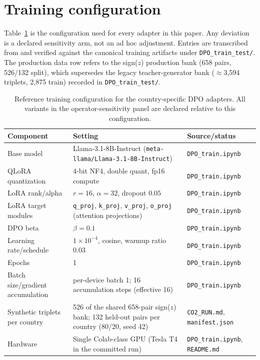 \documentclass[10pt,letterpaper]{article}
\begin{document}
\section{Training configuration}
\label{app:trainconfig}
Table~\ref{tab:trainconfig} is the configuration used for every adapter in this paper. Any deviation is a declared sensitivity arm, not an ad hoc adjustment. Entries are transcribed from and verified against the canonical training artifacts under \texttt{DPO\_train\_test/}. The production data row refers to the sign($z$) production bank (658 pairs, 526/132 split), which supersedes the legacy teacher-generator bank ($\approx$3{,}594 triplets, 2{,}875 train) recorded in \texttt{DPO\_train\_test/}.

\begin{table}[H]
\centering\small
\caption{Reference training configuration for the country-specific DPO adapters. All variants in the operator-sensitivity panel are declared relative to this configuration.}\label{tab:trainconfig}
\begin{tabularx}{\textwidth}{@{}p{3.6cm}Xp{4cm}@{}}
\toprule
\textbf{Component} & \textbf{Setting} & \textbf{Source/status}\\
\midrule
Base model & Llama-3.1-8B-Instruct (\texttt{meta-llama/Llama-3.1-8B-Instruct}) & \texttt{DPO\_train.ipynb}\\
QLoRA quantization & 4-bit NF4, double quant, fp16 compute & \texttt{DPO\_train.ipynb}\\
LoRA rank/alpha & $r=16$, $\alpha=32$, dropout $0.05$ & \texttt{DPO\_train.ipynb}\\
LoRA target modules & \texttt{q\_proj}, \texttt{k\_proj}, \texttt{v\_proj}, \texttt{o\_proj} (attention projections) & \texttt{DPO\_train.ipynb}\\
DPO beta & $\beta=0.1$ & \texttt{DPO\_train.ipynb}\\
Learning rate/schedule & $1\times10^{-4}$, cosine, warmup ratio $0.03$ & \texttt{DPO\_train.ipynb}\\
Epochs & 1 & \texttt{DPO\_train.ipynb}\\
Batch size/gradient accumulation & per-device batch 1; 16 accumulation steps (effective 16) & \texttt{DPO\_train.ipynb}\\
Synthetic triplets per country & 526 of the shared 658-pair sign($z$) bank; 132 held-out pairs per country (80/20, seed 42) & \texttt{CO2\_RUN.md}, \texttt{manifest.json}\\
Hardware & Single Colab-class GPU (Tesla T4 in the committed run) & \texttt{DPO\_train.ipynb}, \texttt{README.md}\\
\bottomrule
\end{tabularx}
\end{table}
\end{document}
